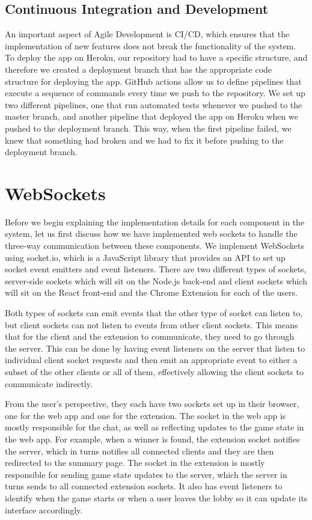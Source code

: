 \documentclass{l4proj}
\begin{document}
\subsection{Continuous Integration and Development}
An important aspect of Agile Development is CI/CD, which ensures that the implementation of new features does not break the functionality of the system. To deploy the app on Heroku, our repository had to have a specific structure, and therefore we created a deployment branch that has the appropriate code structure for deploying the app. GitHub actions allow us to define pipelines that execute a sequence of commands every time we push to the repository. We set up two different pipelines, one that run automated tests whenever we pushed to the master branch, and another pipeline that deployed the app on Heroku when we pushed to the deployment branch. This way, when the first pipeline failed, we knew that something had broken and we had to fix it before pushing to the deployment branch.

\section{WebSockets}
Before we begin explaining the implementation details for each component in the system, let us first discuss how we have implemented web sockets to handle the three-way communication between these components. We implement WebSockets using socket.io, which is a JavaScript library that provides an API to set up socket event emitters and event listeners. There are two different types of sockets, server-side sockets which will sit on the Node.js back-end and client sockets which will sit on the React front-end and the Chrome Extension for each of the users. 

Both types of sockets can emit events that the other type of socket can listen to, but client sockets can not listen to events from other client sockets. This means that for the client and the extension to communicate, they need to go through the server. This can be done by having event listeners on the server that listen to individual client socket requests and then emit an appropriate event to either a subset of the other clients or all of them, effectively allowing the client sockets to communicate indirectly.

From the user's perspective, they each have two sockets set up in their browser, one for the web app and one for the extension. The socket in the web app is mostly responsible for the chat, as well as reflecting updates to the game state in the web app. For example, when a winner is found, the extension socket notifies the server, which in turns notifies all connected clients and they are then redirected to the summary page. The socket in the extension is mostly responsible for sending game state updates to the server, which the server in turns sends to all connected extension sockets. It also has event listeners to identify when the game starts or when a user leaves the lobby so it can update its interface accordingly.
\end{document}
